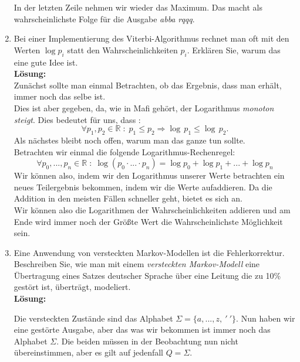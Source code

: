 \documentclass[11pt,a4paper,ngerman]{article}
\begin{document}
\begin{enumerate}[\bfseries (a)]
In der letzten Zeile nehmen wir wieder das Maximum. Das macht als wahrscheinlichste Folge für die Ausgabe \emph{abba} \emph{rqqq}.


\item Bei einer Implementierung des Viterbi-Algorithmus rechnet man oft mit den Werten $\log p_i$ statt den Wahrscheinlichkeiten $p_i$. Erklären Sie, warum das eine gute Idee ist.\\

\textbf{Lösung:}\\
Zunächst sollte man einmal Betrachten, ob das Ergebnis, dass man erhält, immer noch das selbe ist.\\
Dies ist aber gegeben, da, wie in Mafi gehört, der Logarithmus \emph{monoton steigt}. Dies bedeutet für uns, dass :
$$
\forall p_1 , p_2 \in \mathbb{R} \; : \; p_1 \leq p_2 \Rightarrow \log \, p_1 \leq \log \, p_2.
$$ 
Als nächstes bleibt noch offen, warum man das ganze tun sollte.\\

Betrachten wir einmal die folgende Logarithmus-Rechenregel:
$$
\forall p_0,...,p_n \in \mathbb{R} \; : \;\log \left( p_0 \cdot ... \cdot p_n \right) = \log p_0 + \log p_1 +...+\log p_n
$$
Wir können also, indem wir den Logarithmus unserer Werte betrachten ein neues Teilergebnis bekommen, indem wir die Werte aufaddieren. Da die Addition in den meisten Fällen schneller geht, bietet es sich an.\\

Wir können also die Logarithmen der Wahrscheinlichkeiten addieren und am Ende wird immer noch der Größte Wert die Wahrscheinlichste Möglichkeit sein.

\item Eine Anwendung von versteckten Markov-Modellen ist die Fehlerkorrektur. Beschreiben Sie, wie man mit einem \emph{versteckten Markov-Modell} eine Übertragung eines Satzes deutscher Sprache über eine Leitung die zu 10\% gestört ist, überträgt, modeliert.\\

\textbf{Lösung:}

Die versteckten Zustände sind das Alphabet $\Sigma = \{ a, ... , z ,\ ' \ ' \}$. Nun haben wir eine gestörte Ausgabe, aber das was wir bekommen ist immer noch das Alphabet $\Sigma$. Die beiden müssen in der Beobachtung nun nicht übereinstimmen, aber es gilt auf jedenfall $Q = \Sigma$.\\


\end{enumerate}
\end{document}

